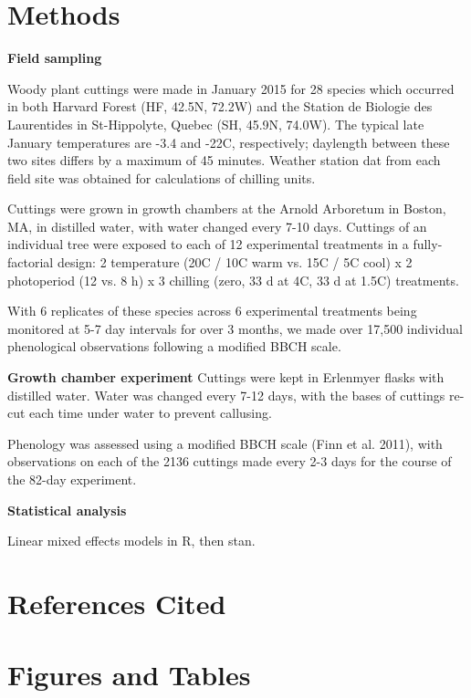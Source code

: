 \documentclass{article}
\begin{document}
\section*{Methods}

\textbf{Field sampling}

Woody plant cuttings were made in January 2015 for 28 species which occurred in both Harvard Forest (HF, 42.5\degree N, 72.2\degree W) and the Station de Biologie des Laurentides in St-Hippolyte, Quebec (SH, 45.9\degree N, 74.0\degree W). The typical late January temperatures are -3.4 and -22\degree C, respectively; daylength between these two sites differs by a maximum of 45 minutes. Weather station dat from each field site was obtained for calculations of chilling units. 

Cuttings were grown in growth chambers at the Arnold Arboretum in Boston, MA, in distilled water, with water changed every 7-10 days. Cuttings of an individual tree were exposed to each of 12 experimental treatments in a fully-factorial design: 2 temperature (20\degree C / 10\degree C warm vs. 15\degree C / 5\degree C cool) x 2 photoperiod (12 vs. 8 h) x 3 chilling (zero,  33 d at 4\degree C, 33 d at 1.5\degree C) treatments. 

With 6 replicates of these species across 6 experimental treatments being monitored at 5-7 day intervals for over 3 months, we made over 17,500 individual phenological observations following a modified BBCH scale.

\textbf{Growth chamber experiment}
Cuttings were kept in Erlenmyer flasks with distilled water. Water was changed every 7-12 days, with the bases of cuttings re-cut each time under water to prevent callusing.

Phenology was assessed using a modified BBCH scale (Finn et al. 2011), with observations on each of the 2136 cuttings made every 2-3 days for the course of the 82-day experiment.

\textbf{Statistical analysis}

Linear mixed effects models in R, then stan.

\section*{References Cited}


\section*{Figures and Tables}
\listoftables
\end{document}
